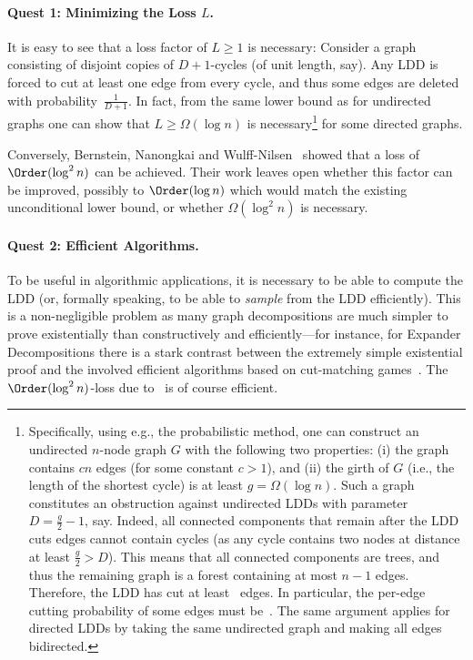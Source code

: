 \paragraph{Quest 1: Minimizing the Loss \boldmath$L$.}
It is easy to see that a loss factor of $L \geq 1$ is necessary: Consider a graph consisting of disjoint copies of $D + 1$-cycles (of unit length, say). Any LDD is forced to cut at least one edge from every cycle, and thus some edges are deleted with probability~$\frac{1}{D+1}$. In fact, from the same lower bound as for undirected graphs one can show that $L \geq \Omega(\log n)$ is necessary\footnote{Specifically, using e.g., the probabilistic method, one can construct an undirected $n$-node graph $G$ with the following two properties: (i) the graph contains $c n$ edges (for some constant $c > 1$), and (ii) the girth of $G$ (i.e., the length of the shortest cycle) is at least $g = \Omega(\log n)$. Such a graph constitutes an obstruction against undirected LDDs with parameter $D = \frac{g}{2} - 1$, say. Indeed, all connected components that remain after the LDD cuts edges cannot contain cycles (as any cycle contains two nodes at distance at least $\frac{g}{2} > D$). This means that all connected components are trees, and thus the remaining graph is a forest containing at most $n - 1$ edges. Therefore, the LDD has cut at least~ edges. In particular, the per-edge cutting probability of some edges must be~. The same argument applies for directed LDDs by taking the same undirected graph and making all edges bidirected.\label{foot:logn-lower-bound}} for some directed graphs.

Conversely, Bernstein, Nanongkai and Wulff-Nilsen~\cite{BernsteinNW22} showed that a loss of $\Order(\log^2 n)$ can be achieved. Their work leaves open whether this factor can be improved, possibly to $\Order(\log n)$ which would match the existing unconditional lower bound, or whether $\Omega(\log^2 n)$ is necessary.


\paragraph{Quest 2: Efficient Algorithms.}
To be useful in algorithmic applications, it is necessary to be able to compute the LDD (or, formally speaking, to be able to \emph{sample} from the LDD efficiently). This is a non-negligible problem as many graph decompositions are much simpler to prove existentially than constructively and efficiently---for instance, for Expander Decompositions there is a stark contrast between the extremely simple existential proof and the involved efficient algorithms based on cut-matching games~\cite{RackeST14,KhandekarRaoVazirani09}. The $\Order(\log^2 n)$-loss due to~\cite{BernsteinNW22} is of course efficient.

